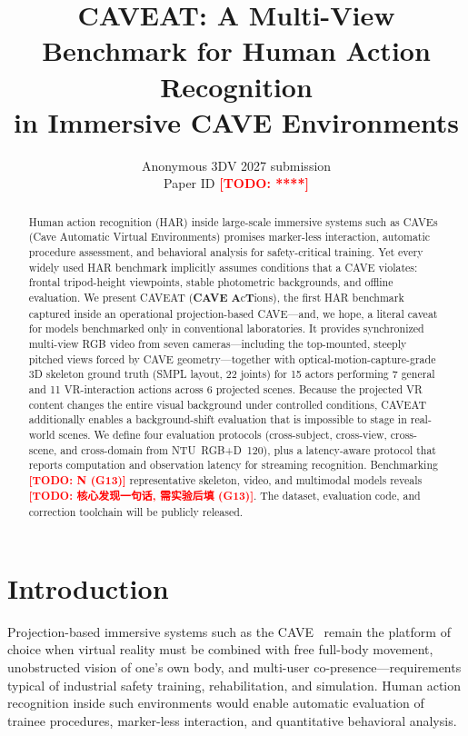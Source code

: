 \documentclass[10pt,twocolumn,letterpaper]{article}
\newcommand{\todocjkfont}{}
\newif\iftodos \todostrue   %
\newcommand{\todo}[1]{\iftodos\textcolor{red}{\textbf{[TODO: {\todocjkfont #1}]}}\fi}
\newcommand{\DATASET}{CAVEAT}
\begin{document}
\title{\DATASET: A Multi-View Benchmark for Human Action Recognition\\
in Immersive CAVE Environments}

\author{Anonymous 3DV 2027 submission\\Paper ID \todo{****}}
\date{}
\maketitle

\begin{abstract}
Human action recognition (HAR) inside large-scale immersive systems such as
CAVEs (Cave Automatic Virtual Environments) promises marker-less
interaction, automatic procedure assessment, and behavioral analysis for
safety-critical training. Yet every widely used HAR benchmark implicitly
assumes conditions that a CAVE violates: frontal tripod-height viewpoints,
stable photometric backgrounds, and offline evaluation. We present
\DATASET{} (\textbf{CAVE} \textbf{A}c\textbf{T}ions), the first HAR
benchmark captured inside an operational projection-based CAVE---and, we
hope, a literal caveat for models benchmarked only in conventional
laboratories. It provides synchronized multi-view RGB video from
seven cameras---including the top-mounted, steeply pitched views forced by
CAVE geometry---together with optical-motion-capture-grade 3D skeleton
ground truth (SMPL layout, 22 joints) for 15 actors performing 7 general
and 11 VR-interaction actions across 6 projected scenes. Because the
projected VR content changes the entire visual background under controlled
conditions, \DATASET{} additionally enables a background-shift evaluation
that is impossible to stage in real-world scenes. We define four evaluation
protocols (cross-subject, cross-view, cross-scene, and cross-domain from
NTU~RGB+D~120), plus a latency-aware protocol that reports computation and
observation latency for streaming recognition. Benchmarking
\todo{N (G13)} representative skeleton, video, and multimodal models
reveals \todo{核心发现一句话, 需实验后填 (G13)}. The dataset, evaluation
code, and correction toolchain will be publicly released.
\end{abstract}

\section{Introduction}
Projection-based immersive systems such as the CAVE~\cite{cruzneira1993cave}
remain the platform of choice when virtual reality must be combined with
free full-body movement, unobstructed vision of one's own body, and
multi-user co-presence---requirements typical of industrial safety
training, rehabilitation, and simulation. Human action recognition inside
such environments would enable automatic evaluation of trainee procedures,
marker-less interaction, and quantitative behavioral analysis.
\end{document}
